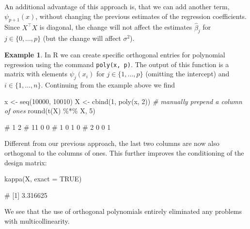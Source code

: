 \documentclass[
  a4paper,
]{article}
\newenvironment{Shaded}{\begin{snugshade}}{\end{snugshade}}
\newcommand{\AttributeTok}[1]{\textcolor[rgb]{0.77,0.63,0.00}{#1}}
\newcommand{\CommentTok}[1]{\textcolor[rgb]{0.56,0.35,0.01}{\textit{#1}}}
\newcommand{\ConstantTok}[1]{\textcolor[rgb]{0.00,0.00,0.00}{#1}}
\newcommand{\DecValTok}[1]{\textcolor[rgb]{0.00,0.00,0.81}{#1}}
\newcommand{\FunctionTok}[1]{\textcolor[rgb]{0.00,0.00,0.00}{#1}}
\newcommand{\NormalTok}[1]{#1}
\newcommand{\OtherTok}[1]{\textcolor[rgb]{0.56,0.35,0.01}{#1}}
\newcommand{\SpecialCharTok}[1]{\textcolor[rgb]{0.00,0.00,0.00}{#1}}
\theoremstyle{definition}
\theoremstyle{definition}
\newtheorem{example}{Example}[section]
\theoremstyle{definition}
\theoremstyle{definition}
\theoremstyle{remark}
\begin{document}
An additional advantage of this approach is, that we can add another term,
\(\psi_{p+1}(x)\), without changing the previous estimates of the regression
coefficients. Since \(X^\top X\) is diagonal, the change will not affect the
estimates \(\hat\beta_j\) for \(j\in \{0, \ldots, p\}\) (but the change will affect
\(\sigma^2\)).

\begin{example}
In R we can create specific orthogonal entries for polynomial regression using
the command \texttt{poly(x,\ p)}. The output of this function is a matrix
with elements \(\psi_j(x_i)\) for \(j \in \{1, \ldots, p\}\) (omitting the intercept)
and \(i \in \{1, \ldots, n\}\). Continuing from the example above we find

\begin{Shaded}
\begin{Highlighting}[]
\NormalTok{x }\OtherTok{\textless{}{-}} \FunctionTok{seq}\NormalTok{(}\DecValTok{10000}\NormalTok{, }\DecValTok{10010}\NormalTok{)}
\NormalTok{X }\OtherTok{\textless{}{-}} \FunctionTok{cbind}\NormalTok{(}\DecValTok{1}\NormalTok{, }\FunctionTok{poly}\NormalTok{(x, }\DecValTok{2}\NormalTok{)) }\CommentTok{\# manually prepend a column of ones}
\FunctionTok{round}\NormalTok{(}\FunctionTok{t}\NormalTok{(X) }\SpecialCharTok{\%*\%}\NormalTok{ X, }\DecValTok{5}\NormalTok{)}
\end{Highlighting}
\end{Shaded}

\begin{Shaded}
\begin{Highlighting}[]
\NormalTok{\#      1 2}
\NormalTok{\#   11 0 0}
\NormalTok{\# 1  0 1 0}
\NormalTok{\# 2  0 0 1}
\end{Highlighting}
\end{Shaded}

Different from our previous approach, the last two columns are now also
orthogonal to the columns of ones. This further improves the conditioning
of the design matrix:

\begin{Shaded}
\begin{Highlighting}[]
\FunctionTok{kappa}\NormalTok{(X, }\AttributeTok{exact =} \ConstantTok{TRUE}\NormalTok{)}
\end{Highlighting}
\end{Shaded}

\begin{Shaded}
\begin{Highlighting}[]
\NormalTok{\# [1] 3.316625}
\end{Highlighting}
\end{Shaded}

We see that the use of orthogonal polynomials entirely eliminated any
problems with multicollinearity.
\end{example}
\end{document}
